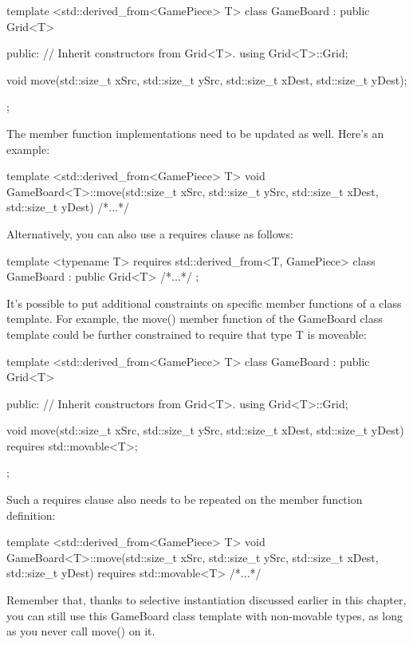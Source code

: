 \begin{cpp}
template <std::derived_from<GamePiece> T>
class GameBoard : public Grid<T>
{
    public:
        // Inherit constructors from Grid<T>.
        using Grid<T>::Grid;

        void move(std::size_t xSrc, std::size_t ySrc,
            std::size_t xDest, std::size_t yDest);
};
\end{cpp}

The member function implementations need to be updated as well. Here’s an example:

\begin{cpp}
template <std::derived_from<GamePiece> T>
void GameBoard<T>::move(std::size_t xSrc, std::size_t ySrc,
    std::size_t xDest, std::size_t yDest) { /*...*/ }
\end{cpp}

Alternatively, you can also use a requires clause as follows:

\begin{cpp}
template <typename T> requires std::derived_from<T, GamePiece>
class GameBoard : public Grid<T> { /*...*/ };
\end{cpp}



It’s possible to put additional constraints on specific member functions of a class template. For example, the move() member function of the GameBoard class template could be further constrained to require that type T is moveable:

\begin{cpp}
template <std::derived_from<GamePiece> T>
class GameBoard : public Grid<T>
{
    public:
        // Inherit constructors from Grid<T>.
        using Grid<T>::Grid;

        void move(std::size_t xSrc, std::size_t ySrc,
            std::size_t xDest, std::size_t yDest) requires std::movable<T>;
};
\end{cpp}

Such a requires clause also needs to be repeated on the member function definition:

\begin{cpp}
template <std::derived_from<GamePiece> T>
void GameBoard<T>::move(std::size_t xSrc, std::size_t ySrc,
    std::size_t xDest, std::size_t yDest) requires std::movable<T>
{ /*...*/ }
\end{cpp}

Remember that, thanks to selective instantiation discussed earlier in this chapter, you can still use this GameBoard class template with non-movable types, as long as you never call move() on it.

